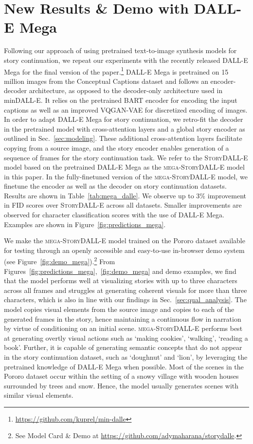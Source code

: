 \documentclass[runningheads]{llncs}
\newcommand{\sdalle}[1]{\textsc{StoryDALL-E}}
\newcommand{\sdallem}[1]{\textsc{mega-StoryDALL-E}}
\begin{document}
\section{New Results \& Demo with DALL-E Mega}
Following our approach of using pretrained text-to-image synthesis models for story continuation, we repeat our experiments with the recently released DALL-E Mega for the final version of the paper.\footnote{\url{https://github.com/kuprel/min-dalle}} DALL-E Mega is pretrained on 15 million images from the Conceptual Captions dataset \cite{sharma2018conceptual} and follows an encoder-decoder architecture, as opposed to the decoder-only architecture used in minDALL-E. It relies on the pretrained BART encoder \cite{lewis2020bart} for encoding the input captions as well as an improved VQGAN-VAE for discretized encoding of images. In order to adapt DALL-E Mega for story continuation, we retro-fit the decoder in the pretrained model with cross-attention layers and a global story encoder as outlined in Sec.~\ref{sec:modeling}. These additional cross-attention layers facilitate copying from a source image, and the story encoder enables generation of a sequence of frames for the story continuation task. We refer to the \sdalle{} model based on the pretrained DALL-E Mega as the \sdallem{} model in this paper. In the fully-finetuned version of the \sdallem{} model, we finetune the encoder as well as the decoder on story continuation datasets. Results are shown in Table~\ref{tab:mega_dalle}. We observe up to 3\% improvement in FID scores over \sdalle{} across all datasets. Smaller improvements are observed for character classification scores with the use of DALL-E Mega. Examples are shown in Figure~\ref{fig:predictions_mega}.


We make the \sdallem{} model trained on the Pororo dataset available for testing through an openly accessible and easy-to-use in-browser demo system (see Figure~\ref{fig:demo_mega}).\footnote{See Model Card \cite{mitchell2019model} \& Demo at \url{https://github.com/adymaharana/storydalle}.} From Figures~\ref{fig:predictions_mega},~\ref{fig:demo_mega} and demo examples, we find that the model performs well at visualizing stories with up to three characters across all frames and struggles at generating coherent visuals for more than three characters, which is also in line with our findings in Sec.~\ref{sec:qual_analysis}. The model copies visual elements from the source image and copies to each of the generated frames in the story, hence maintaining a continuous flow in narration by virtue of conditioning on an initial scene. \sdallem{} performs best at generating overtly visual actions such as `making cookies', `walking', `reading a book'. Further, it is capable of generating semantic concepts that do not appear in the story continuation dataset, such as `doughnut' and `lion', by leveraging the pretrained knowledge of DALL-E Mega when possible. Most of the scenes in the Pororo dataset occur within the setting of a snowy village with wooden houses surrounded by trees and snow. Hence, the model usually generates scenes with similar visual elements.
\end{document}
